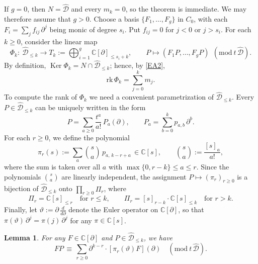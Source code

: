 \documentclass[11pt,reqno]{amsart}
\theoremstyle{plain}
\newtheorem{lemma}{Lemma}[section]
\theoremstyle{definition}
\theoremstyle{remark}
\numberwithin{equation}{section}
\newcommand{\cD}{\mathcal{D}}
\newcommand{\C}{\mathbb{C}}
\newcommand{\del}{\partial}
\newcommand{\hD}{\widehat{\cD}}
\newcommand{\ff}[2]{[#1]_{#2}}          %
\DeclareMathOperator{\Ker}{Ker}
\begin{document}
If $g = 0$, then $N = \hD$ and every $m_k = 0$, so  the theorem is immediate. We may therefore
assume that $g > 0$. Choose a basis $\{F_1, \ldots, F_g\}$ in $C_0$, with each
$F_i = \sum_j f_{ij}\, \del^j$ being monic of degree $s_i$. Put $f_{ij} = 0$ for $j < 0$ or
$j > s_i$. For each $k \ge 0$, consider the linear map
\[
  \Phi_k : \ \hD_{\le k} \to T_k := \bigoplus_{i=1}^g \C[\del]_{\le s_i + k} , \qquad P \mapsto
  (F_1 P, \ldots, F_g P) \ \ (\mathrm{mod}\ t\, \hD) .
\]
By definition, $\Ker \Phi_k = N \cap \hD_{\le k}$; hence, by \eqref{EA2},
\begin{equation}
\label{EA3}
  \mathrm{rk}\, \Phi_k = \sum_{j=0}^{k} m_j .
\end{equation}
To compute the rank of $\Phi_k$ we need a convenient parametrization of $\hD_{\le k}$. Every
$P \in \hD_{\le k}$ can be uniquely written in the form
\[
  P = \sum_{a \ge 0} \frac{t^a}{a!}\, P_a(\del) , \qquad P_a = \sum_{b=0}^k p_{a,b}\, \del^b .
\]
For each $r \ge 0$, we define the polynomial
\[
  \pi_r(s) := \sum_{a} \binom{s}{a}\, p_{a,\, k - r + a} \, \in \C[s] , \qquad \binom{s}{a} :=
  \frac{\ff{s}{a}}{a!} ,
\]
where the sum is taken over all $a$ with $\max\{0, r - k\} \le a \le r$. Since the polynomials
$\binom{s}{a}$ are linearly independent, the assignment $P \mapsto (\pi_r)_{r \ge 0}$ is a
bijection of $\hD_{\le k}$ onto $\prod_{r \ge 0} \Pi_r$, where
\[
  \Pi_r = \C[s]_{\le r} \quad \text{for } r \le k , \qquad \Pi_r = \ff{s}{r-k} \cdot \C[s]_{\le k}
  \quad \text{for } r > k .
\]
Finally, let $\vartheta := \del\, \frac{d}{d \del}$ denote the Euler operator on $\C[\del]$, so
that $\pi(\vartheta)\, \del^j = \pi(j)\, \del^j$ for any $\pi \in \C[s]$.

\begin{lemma}
\label{LA.1}
For any $F \in \C[\del]$ and $P \in \hD_{\le k}$, we have
\[
  F P \, \equiv \, \sum_{r \ge 0} \del^{k-r} \cdot [\pi_r(\vartheta) F](\del) \quad (\mathrm{mod}\ t\,
  \hD) .
\]
\end{lemma}
\end{document}
